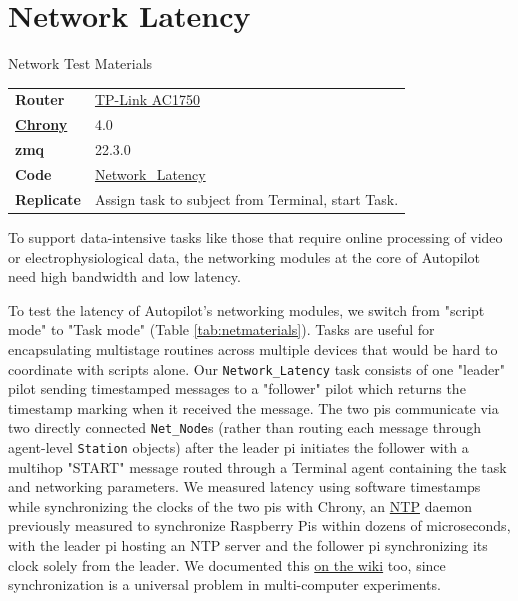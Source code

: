 
\section{Network Latency}
\label{sec:networklatency}


\begin{margintable}[2.5cm]
\caption{Network Test Materials}
\label{tab:netmaterials}
\noindent\begin{tabularx}{\linewidth}{lX}%
\toprule
\textbf{Router} & \href{https://www.tp-link.com/us/home-networking/wifi-router/archer-c7/}{TP-Link AC1750} \\
\href{https://wiki.auto-pi-lot.com/index.php/NTP}{\textbf{Chrony}} & 4.0 \\
\textbf{zmq} & 22.3.0 \\
\textbf{Code} & \href{https://github.com/auto-pi-lot/plugin-paper/blob/main/plugin_paper/tasks/network.py}{Network\_Latency} \\
\textbf{Replicate} & Assign task to subject from Terminal, start Task. \\
\bottomrule
\end{tabularx}
\end{margintable}

To support data-intensive tasks like those that require online processing of video or electrophysiological data, the networking modules at the core of Autopilot need high bandwidth and low latency. 

To test the latency of Autopilot's networking modules, we switch from "script mode" to "Task mode" (Table \ref{tab:netmaterials}). Tasks are useful for encapsulating multistage routines across multiple devices that would be hard to coordinate with scripts alone. Our \texttt{Network\_Latency} task consists of one "leader" pilot sending timestamped messages to a "follower" pilot which returns the timestamp marking when it received the message. The two pis communicate via two directly connected \texttt{Net\_Node}s (rather than routing each message through agent-level \texttt{Station} objects) after the leader pi initiates the follower with a multihop "START" message routed through a Terminal agent containing the task and networking parameters. We measured latency using software timestamps while synchronizing the clocks of the two pis with Chrony, an \href{https://en.wikipedia.org/wiki/Network\_Time\_Protocol}{NTP} daemon previously measured to synchronize Raspberry Pis within dozens of microseconds\citep{soaresAnalysisTimekeepingExperimentation2020}, with the leader pi hosting an NTP server and the follower pi synchronizing its clock solely from the leader. We documented this \href{https://wiki.auto-pi-lot.com/index.php/NTP}{on the wiki} too, since synchronization is a universal problem in multi-computer experiments.

